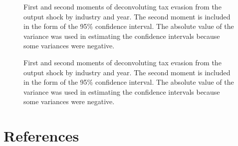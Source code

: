 \documentclass[
  12pt]{article}
\theoremstyle{definition}
\theoremstyle{remark}
\begin{document}
\begin{figure}


\caption{\label{fig-deconv-mmt-year-5}First and second moments of
deconvoluting tax evasion from the output shock by industry and year.
The second moment is included in the form of the 95\% confidence
interval. The absolute value of the variance was used in estimating the
confidence intervals because some variances were negative.}

\end{figure}%

\begin{figure}


\caption{\label{fig-deconv-mmt-year-6}First and second moments of
deconvoluting tax evasion from the output shock by industry and year.
The second moment is included in the form of the 95\% confidence
interval. The absolute value of the variance was used in estimating the
confidence intervals because some variances were negative.}

\end{figure}%

\section{References}\label{references}

\renewcommand{\bibsection}{}

\end{document}
